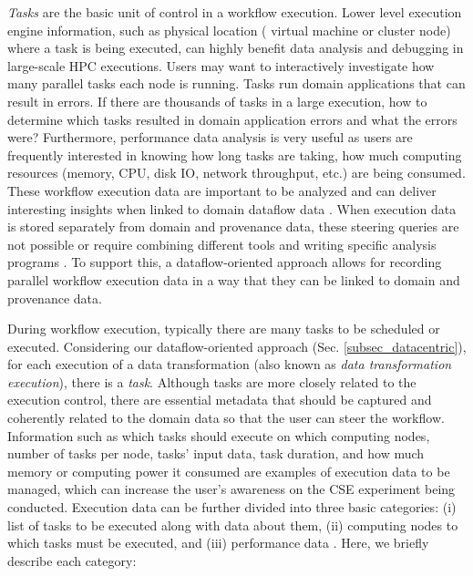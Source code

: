 \textit{Tasks} are the basic unit of control in a workflow execution.
Lower level execution engine information, such as physical location (\ie{} virtual machine or cluster node) where a task is being executed, can highly benefit data analysis and debugging in large-scale HPC executions.
Users may want to interactively investigate how many parallel tasks each node is running.
Tasks run domain applications that can result in errors. If there are thousands of tasks in a large execution, how to determine which tasks resulted in domain application errors and what the errors were?
Furthermore, performance data analysis is very useful as users are frequently interested in knowing how long tasks are taking, how much computing resources (memory, CPU, disk IO, network throughput, etc.) are being consumed.
These workflow execution data are important to be analyzed and can deliver interesting insights when linked to domain dataflow data \cite{silva_adding_2018,Souza2015Monitoramento}.
When execution data is stored separately from domain and provenance data, these steering queries are not possible or require combining different tools and writing specific analysis programs \cite{Silva2017Raw}.
To support this, a dataflow-oriented approach allows for recording parallel workflow execution data in a way that they can be linked to domain and provenance data.

During workflow execution, typically there are many tasks to be scheduled or executed.
Considering our dataflow-oriented approach (Sec. \ref{subsec_datacentric}), for each execution of a data transformation (also known as \textit{data transformation execution}), there is a \textit{task}. Although tasks are more closely related to the execution control, there are essential metadata that should be captured and coherently related to the domain data so that the user can steer the workflow. Information such as which tasks should execute on which
computing nodes, number of tasks per node, tasks' input data, task
duration, and how much memory or computing power it consumed are
examples of execution data to be managed, which can increase the user's awareness on the CSE experiment being conducted. Execution data can be further divided into three basic categories: (i)
list of tasks to be executed along with data about them, (ii) computing
nodes to which tasks must be executed, and (iii) performance data
\cite{Ogasawara2011algebraic,Oliveira2010SciCumulus:,silva_adding_2018,Souza2015Monitoramento}. Here, we briefly describe each category:

